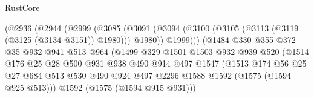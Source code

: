 \begin{lexlean}{RustCore}
\begin{coremodule}
                                (@2936
                                  (@2944
                                    (@2999
                                      (@3085
                                        (@3091
                                          (@3094
                                            (@3100
                                              (@3105 (@3113 (@3119 (@3125 (@3134 @3151)) @1980)))
                                              @1980))
                                          @1999)))
                                    (@1484
                                      @330
                                      @355
                                      @372
                                      @35
                                      @932
                                      @941
                                      @513
                                      @964
                                      (@1499
                                        @329
                                        @1501
                                        @1503
                                        @932
                                        @939
                                        @520
                                        (@1514
                                          @176
                                          @25
                                          @28
                                          @500
                                          @931
                                          @938
                                          @490
                                          @914
                                          @497
                                          @1547
                                          (@1513
                                            @174
                                            @56
                                            @25
                                            @27
                                            @684
                                            @513
                                            @530
                                            @490
                                            @924
                                            @497
                                            @2296
                                            @1588
                                            @1592
                                            (@1575 (@1594 @925 @513)))
                                          @1592
                                          (@1575 (@1594 @915 @931)))

\end{coremodule}
\end{lexlean}

